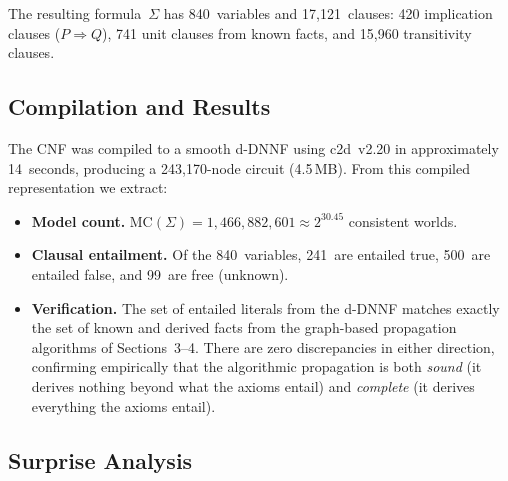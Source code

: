 \documentclass[10pt]{article}
\theoremstyle{plain}
\theoremstyle{definition}
\theoremstyle{remark}
\begin{document}
The resulting formula~$\Sigma$ has 840~variables and 17{,}121~clauses: 420 implication clauses ($P \Rightarrow Q$), 741 unit clauses from known facts, and 15{,}960 transitivity clauses.

\subsection{Compilation and Results}

The CNF was compiled to a smooth d-DNNF using c2d~v2.20 in approximately 14~seconds, producing a 243{,}170-node circuit (4.5\,MB). From this compiled representation we extract:

\begin{itemize}
  \item \textbf{Model count.} $\text{MC}(\Sigma) = 1{,}466{,}882{,}601 \approx 2^{30.45}$ consistent worlds.
  \item \textbf{Clausal entailment.} Of the 840~variables, 241~are entailed true, 500~are entailed false, and 99~are free (unknown).
  \item \textbf{Verification.} The set of entailed literals from the d-DNNF matches exactly the set of known and derived facts from the graph-based propagation algorithms of Sections~3--4. There are zero discrepancies in either direction, confirming empirically that the algorithmic propagation is both \emph{sound} (it derives nothing beyond what the axioms entail) and \emph{complete} (it derives everything the axioms entail).
\end{itemize}

\subsection{Surprise Analysis}
\end{document}
